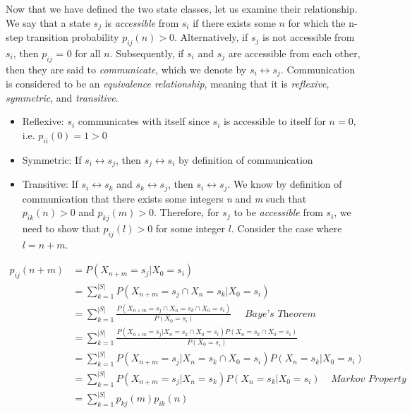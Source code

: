 \documentclass[a4paper, 12pt]{article}
\begin{document}
	Now that we have defined the two state classes, let us examine their relationship. We say that a state $s_j$ is 
	\textit{accessible} from $s_i$ if there exists some $n$ for which the n-step transition probability $p_{ij}(n) > 0$.
	Alternatively, if $s_j$ is not accessible from $s_i$, then $p_{ij}$ = 0 for all $n$. Subsequently, if $s_i$ and $s_j$ 
	are accessible from each other, then they are said to \textit{communicate}, which we denote by $s_i \leftrightarrow s_j$.
	Communication is considered to be an \textit{equivalence relationship}, meaning that it is \textit{reflexive}, 
	\textit{symmetric}, and \textit{transitive}.

	\begin{itemize}
	\item Reflexive: $s_i$ communicates with itself since $s_i$ is accessible to itself for $n = 0$, i.e. $p_{ii}(0) = 1 > 0$
	\item Symmetric: If $s_i \leftrightarrow s_j$, then $s_j \leftrightarrow s_i$ by definition of communication
	\item Transitive: If $s_i \leftrightarrow s_k$ and $s_k \leftrightarrow s_j$, then $s_i \leftrightarrow s_j$. We know by 
	definition of communication that there exists some integers \textit{n} and \textit{m} such that 
	$p_{ik}(n) > 0$ and $p_{kj}(m) > 0$. Therefore, for $s_j$ to be \textit{accessible} from $s_i$, we need to show that 
	$p_{ij}(l) > 0$ for some integer $l$. Consider the case where $l = n+m$.
	\end{itemize}
	
	\begin{equation*}
		\begin{aligned}
			p_{ij}(n+m) &= P(X_{n+m} = s_j | X_0 = s_i) \\
						&= \sum_{k=1}^{|S|} P(X_{n+m} = s_j \cap X_n = s_k | X_0 = s_i) \\
						&= \sum_{k=1}^{|S|} \frac{P(X_{n+m} = s_j \cap X_n = s_k \cap X_0 = s_i)}{P(X_0 = s_i)}\ \;\;\;\; \textit{Baye's Theorem} \\
						&= \sum_{k=1}^{|S|} \frac{P(X_{n+m} = s_j | X_n = s_k \cap X_0 = s_i)P(X_n = s_k \cap X_0 = s_i)}{P(X_0 = s_i)}\ \\
						&= \sum_{k=1}^{|S|} P(X_{n+m} = s_j | X_n = s_k \cap X_0 = s_i)P(X_n = s_k | X_0 = s_i) \\
						&= \sum_{k=1}^{|S|} P(X_{n+m} = s_j | X_n = s_k)P(X_n = s_k | X_0 = s_i) \;\;\;\; \textit{Markov Property} \\ 
						&= \sum_{k=1}^{|S|} p_{kj}(m)p_{ik}(n) \\
		\end{aligned}
	\end{equation*}	
	
\end{document}
